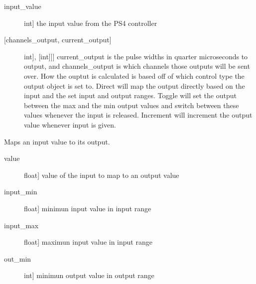 \documentclass[letterpaper,10pt,english]{sphinxmanual}
\begin{document}
\begin{fulllineitems}
\begin{fulllineitems}
\begin{description}
\item[{input\_value}] \leavevmode{[}int{]}
\sphinxAtStartPar
the input value from the PS4 controller

\end{description}

\sphinxAtStartPar
{}
\begin{description}
\item[{{[}channels\_output, current\_output{]}}] \leavevmode{[}{[}{[}int{]}, {[}int{]}{]}{]}
\sphinxAtStartPar
current\_output is the pulse widths in quarter microseconds to output, and channels\_output
is which channels those outputs will be sent over. How the ouptut is calculated is based
off of which control type the output object is set to. Direct will map the output directly
based on the input and the set input and output ranges. Toggle will set the output between
the max and the min output values and switch between these values whenever the input is
released. Increment will increment the output value whenever input is given.

\end{description}

\end{fulllineitems}


\begin{fulllineitems}
\label{\detokenize{specific:EyebrowsOutput.EyebrowsOutput.map_values}}
\sphinxAtStartPar
Maps an input value to its output.

\sphinxAtStartPar
{}
\begin{description}
\item[{value}] \leavevmode{[}float{]}
\sphinxAtStartPar
value of the input to map to an output value

\item[{input\_min}] \leavevmode{[}float{]}
\sphinxAtStartPar
minimun input value in input range

\item[{input\_max}] \leavevmode{[}float{]}
\sphinxAtStartPar
maximun input value in input range

\item[{out\_min}] \leavevmode{[}int{]}
\sphinxAtStartPar
minimun output value in output range


\end{description}
\end{fulllineitems}
\end{fulllineitems}
\end{document}

